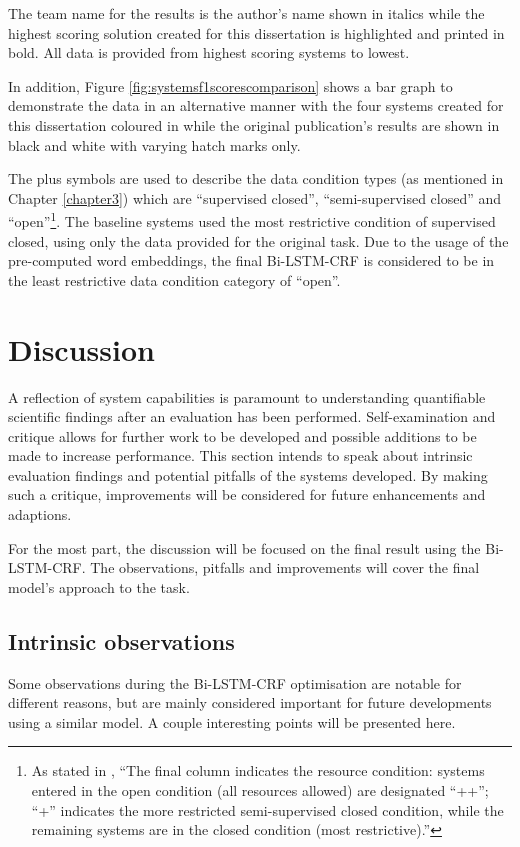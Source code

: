 The team name for the results is the author's name shown in italics while the highest scoring solution created for this dissertation is highlighted and printed in bold. All data is provided from highest scoring systems to lowest. 

In addition, Figure \ref{fig:systemsf1scorescomparison} shows a bar graph to demonstrate the data in an alternative manner with the four systems created for this dissertation coloured in while the original publication's results are shown in black and white with varying hatch marks only. 

The plus symbols are used to describe the data condition types (as mentioned in Chapter \ref{chapter3}) which are ``supervised closed'', ``semi-supervised closed'' and ``open''\footnote{As stated in \cite{Schneider2016}, ``The final column indicates the resource condition: systems entered in the open condition (all resources allowed) are designated “++”; “+” indicates the more restricted semi-supervised closed condition, while the remaining systems are in the closed condition (most restrictive).''}. The baseline systems used the most restrictive condition of supervised closed, using only the data provided for the original \dimsum task. Due to the usage of the pre-computed word embeddings, the final Bi-LSTM-CRF is considered to be in the least restrictive data condition category of ``open''.

\section{Discussion}\label{chapter5discussion}
A reflection of system capabilities is paramount to understanding quantifiable scientific findings after an evaluation has been performed. Self-examination and critique allows for further work to be developed and possible additions to be made to increase performance. This section intends to speak about intrinsic evaluation findings and potential pitfalls of the systems developed. By making such a critique, improvements will be considered for future enhancements and adaptions.  

For the most part, the discussion will be focused on the final result using the Bi-LSTM-CRF. The observations, pitfalls and improvements will cover the final model's approach to the \dimsum task.

\subsection{Intrinsic observations}
Some observations during the Bi-LSTM-CRF optimisation are notable for different reasons, but are mainly considered important for future developments using a similar model. A couple interesting points will be presented here. 

